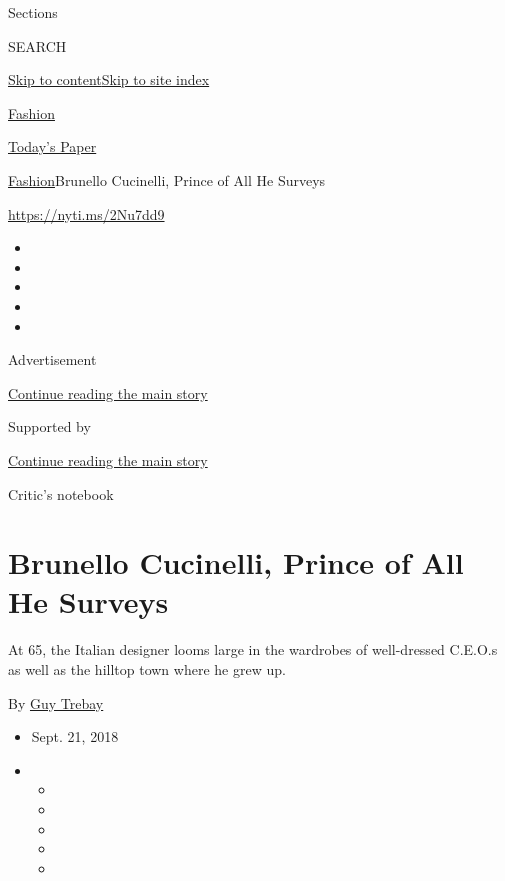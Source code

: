 Sections

SEARCH

\protect\hyperlink{site-content}{Skip to
content}\protect\hyperlink{site-index}{Skip to site index}

\href{https://www.nytimes3xbfgragh.onion/section/fashion}{Fashion}

\href{https://myaccount.nytimes3xbfgragh.onion/auth/login?response_type=cookie\&client_id=vi}{}

\href{https://www.nytimes3xbfgragh.onion/section/todayspaper}{Today's
Paper}

\href{/section/fashion}{Fashion}\textbar{}Brunello Cucinelli, Prince of
All He Surveys

\url{https://nyti.ms/2Nu7dd9}

\begin{itemize}
\item
\item
\item
\item
\item
\end{itemize}

Advertisement

\protect\hyperlink{after-top}{Continue reading the main story}

Supported by

\protect\hyperlink{after-sponsor}{Continue reading the main story}

Critic's notebook

\hypertarget{brunello-cucinelli-prince-of-all-he-surveys}{%
\section{Brunello Cucinelli, Prince of All He
Surveys}\label{brunello-cucinelli-prince-of-all-he-surveys}}

At 65, the Italian designer looms large in the wardrobes of well-dressed
C.E.O.s as well as the hilltop town where he grew up.

By \href{http://www.nytimes3xbfgragh.onion/by/guy-trebay}{Guy Trebay}

\begin{itemize}
\item
  Sept. 21, 2018
\item
  \begin{itemize}
  \item
  \item
  \item
  \item
  \item
  \end{itemize}
\end{itemize}

